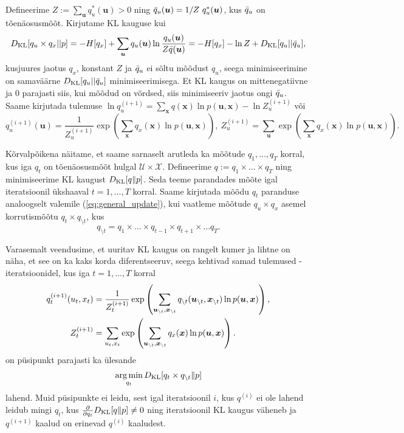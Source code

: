 Defineerime $Z := \sum_{\bm{u}}q_u^*(\bm{u}) > 0$ ning $\Bar{q}_u(\bm{u}) = 1/Z \ q^*_u(\bm{u})$, kus $\Bar{q}_u$ on tõenäosusmõõt. Kirjutame KL kauguse kui
$$D_{\mathrm{KL}}[q_u \times q_x || p] = -H[q_x] + \sum_{\bm{u}} q_u(\bm{u}) \ln \frac{q_u(\bm{u})}{Z \Bar{q}(\bm{u})} = -H[q_x] - \ln Z + D_{\mathrm{KL}}[q_u || \Bar{q}_u],$$
kusjuures jaotus $q_x$, konstant $Z$ ja $\Bar{q}_u$ ei sõltu mõõdust $q_u$, seega minimiseerimine on samaväärne $D_{\mathrm{KL}}[q_u || \Bar{q}_u]$ minimiseerimisega. Et KL kaugus on mittenegatiivne ja $0$ parajasti siis, kui mõõdud on võrdsed, siis minimiseeriv jaotus ongi $\Bar{q}_u$. Saame kirjutada tulemuse
$\ln q_u^{(i+1)} = \sum_{\bm{x}}q(\bm{x}) \ln p(\bm{u},\bm{x}) - \ln Z_u^{(i+1)}$ või
\begin{equation}
    \label{eq:general_update}
    q^{(i+1)}_u(\bm{u}) = \frac{1}{Z_u^{(i+1)}} \exp \left( \sum_{\bm{x}} q_x(\bm{x}) \ln p(\bm{u},\bm{x}) \right),\ Z_u^{(i+1)} = \sum_{\bm{u}}\exp \left( \sum_{\bm{x}} q_x(\bm{x}) \ln p(\bm{u},\bm{x}) \right).
\end{equation}

Kõrvalpõikena näitame, et saame sarnaselt arutleda ka mõõtude $q_1,\ldots,q_T$ korral, kus iga $q_t$ on tõenäosusmõõt hulgal $\mathcal{U} \times \mathcal{X}$. Defineerime $q := q_1 \times \ldots \times q_T$ ning minimiseerime KL kaugust $D_{\mathrm{KL}}[q\|p]$. Seda teeme parandades mõõte igal iteratsioonil ükshaaval $t=1,\ldots,T$ korral. Saame kirjutada mõõdu $q_t$ paranduse analoogselt valemile (\ref{eq:general_update}), kui vaatleme mõõtude $q_u \times q_x$ asemel korrutismõõtu $q_t \times q_{\setminus t}$, kus 
$$q_{\setminus t} = q_1 \times \ldots \times q_{t-1} \times q_{t+1} \times \ldots q_T.$$

Varasemalt veendusime, et uuritav KL kaugus on rangelt kumer ja lihtne on näha, et see on ka kaks korda diferentseeruv, seega kehtivad samad tulemused - iteratsioonidel, kus iga $t = 1,\ldots,T$ korral 
\begin{align}
    \label{eq:vmp_update}
    q^{(i+1)}_t(u_t,x_t) &= \frac{1}{Z_t^{(i+1)}} \exp \left( \sum_{\bm{u}_{\setminus t}, \bm{x}_{\setminus t}} q_{\setminus t}(\bm{u}_{\setminus t}, \bm{x}_{\setminus t}) \ln p(\bm{u},\bm{x}) \right),\\ 
    \notag
    Z_t^{(i+1)} &= \sum_{u_t,x_t}\exp \left( \sum_{\bm{u}_{\setminus t}, \bm{x}_{\setminus t}} q_x(\bm{x}) \ln p(\bm{u},\bm{x}) \right).
\end{align}
on püsipunkt parajasti ka ülesande
$$
\operatorname*{arg\,min}_{q_t} D_{\mathrm{KL}}[q_t \times q_{\setminus t} \| p]
$$
lahend. Muid püsipunkte ei leidu, sest igal iteratsioonil $i$, kus $q^{(i)}$ ei ole lahend leidub mingi $q_t$, kus $\frac{\partial}{\partial q_{t}} D_{\mathrm{KL}}[q \| p] \ne 0$ ning iteratsioonil KL kaugus väheneb ja $q^{(i+1)}$ kaalud on erinevad $q^{(i)}$ kaaludest.

